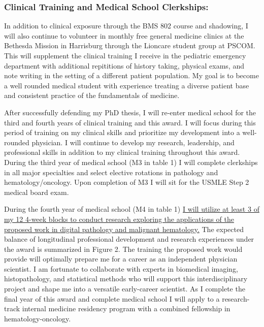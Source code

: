 \documentclass{NIHGrant}
\begin{document}
\subsubsection*{Clinical Training and Medical School Clerkships:}
In addition to clinical exposure through the BMS 802 course and shadowing, I will also continue to volunteer in monthly free general medicine clinics at the Bethesda Mission in Harrisburg through the Lioncare student group at PSCOM. This will supplement the clinical training I receive in the pediatric emergency department with additional repititions of history taking, physical exams, and note writing in the setting of a different patient population. My goal is to become a well rounded medical student with experience treating a diverse patient base and consistent practice of the fundamentals of medicine.

After successfully defending my PhD thesis, I will re-enter medical school for the third and fourth years of clinical training and this award. I will focus during this period of training on my clinical skills and prioritize my development into a well-rounded physician. I will continue to develop my research, leadership, and professional skills in addition to my clinical training throughout this award. During the third year of medical school (M3 in table 1) I will complete clerkships in all major specialties and select elective rotations in pathology and hematology/oncology. Upon completion of M3 I will sit for the USMLE Step 2 medical board exam.

During the fourth year of medical school (M4 in table 1) \uline{I will utilize at least 3 of my 12 4-week blocks to conduct research exploring the applications of the proposed work in digital pathology and malignant hematology.} The expected balance of longitudinal professional development and research experiences under the award is summarized in Figure 2. The training the proposed work would provide will optimally prepare me for a career as an independent physician scientist. I am fortunate to collaborate with experts in biomedical imaging, histopathology, and statistical methods who will support this interdisciplinary project and shape me into a versatile early-career scientist. As I complete the final year of this award and complete medical school I will apply to a research-track internal medicine residency program with a combined fellowship in hematology-oncology.
\end{document}

